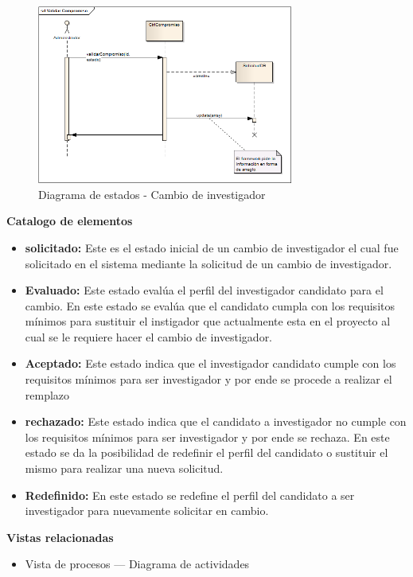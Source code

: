\documentclass[12pt,oneside,letterpaper]{report}
\begin{document}
\begin{figure}[h!]
  \centering
    \includegraphics[width=0.75\textwidth]{./img/img19.png}
  \caption{Diagrama de estados - Cambio de investigador}
\end{figure}

\textbf{Catalogo de elementos}

\begin{itemize}
 \item \textbf{solicitado:} Este es el estado inicial de un cambio de investigador el cual fue solicitado en el sistema mediante la solicitud de un cambio de investigador.
 \item \textbf{Evaluado:} Este estado evalúa el perfil del investigador candidato para el cambio. En este estado se evalúa que el candidato cumpla con los requisitos mínimos para sustituir el instigador que actualmente esta en el proyecto al cual se le requiere hacer el cambio de investigador.
 \item \textbf{Aceptado:} Este estado indica que el investigador candidato cumple con los requisitos mínimos para ser investigador y por ende se procede a realizar el remplazo
 \item \textbf{rechazado:} Este estado indica que el candidato a investigador no cumple con los requisitos mínimos para ser investigador y por ende se rechaza. En este estado se da la posibilidad de redefinir el perfil del candidato o sustituir el mismo para realizar una nueva solicitud.
 \item \textbf{Redefinido:} En este estado se redefine el perfil del candidato a ser investigador para nuevamente solicitar en cambio.
\end{itemize}



\textbf{Vistas relacionadas}
\begin{itemize}
 \item Vista de procesos --- Diagrama de actividades
\end{itemize}
\end{document}
